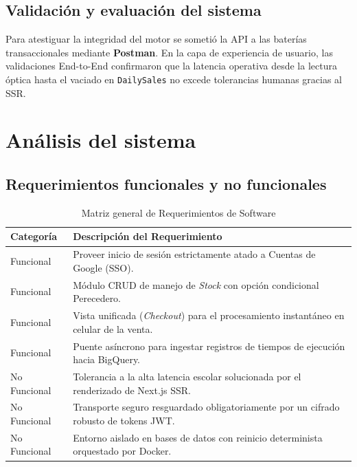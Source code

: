 \documentclass[12pt, a4paper]{article}
\begin{document}
\subsection{Validación y evaluación del sistema}
Para atestiguar la integridad del motor se sometió la API a las baterías transaccionales mediante \textbf{Postman}. En la capa de experiencia de usuario, las validaciones End-to-End confirmaron que la latencia operativa desde la lectura óptica hasta el vaciado en \texttt{DailySales} no excede tolerancias humanas gracias al SSR.

\section{Análisis del sistema}

\subsection{Requerimientos funcionales y no funcionales}
\begin{table}[H]
\centering
\caption{Matriz general de Requerimientos de Software}
\label{tab:requerimientos}
\begin{tabular}{@{}ll@{}}
\toprule
\textbf{Categoría} & \textbf{Descripción del Requerimiento} \\ \midrule
Funcional & Proveer inicio de sesión estrictamente atado a Cuentas de Google (SSO).\\
Funcional & Módulo CRUD de manejo de \textit{Stock} con opción condicional Perecedero.\\
Funcional & Vista unificada (\textit{Checkout}) para el procesamiento instantáneo en celular de la venta.\\
Funcional & Puente asíncrono para ingestar registros de tiempos de ejecución hacia BigQuery.\\
No Funcional & Tolerancia a la alta latencia escolar solucionada por el renderizado de Next.js SSR.\\
No Funcional & Transporte seguro resguardado obligatoriamente por un cifrado robusto de tokens JWT. \\ 
No Funcional & Entorno aislado en bases de datos con reinicio determinista orquestado por Docker. \\ \bottomrule
\end{tabular}
\end{table}
\end{document}
